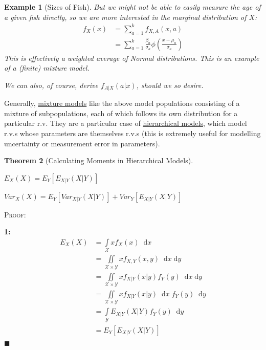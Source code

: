 \documentclass[12pt,a4paper]{article}
\newcommand{\diff}{\;\mathrm{d}}
\newtheorem{thm}{Theorem}[subsection]
\newtheorem{ex}[thm]{Example}
\begin{document}
\begin{ex}[Sizes of Fish]
But we might not be able to easily measure the age of a given fish directly, so we are more interested in the marginal distribution of $X$:
\begin{align*}
f_X(x) &= \sum_{a=1}^k f_{X,A}(x,a)\\
&= \sum_{a=1}^k \frac{\beta_a}{\sigma_a} \phi\left(\frac{x-\mu_a}{\sigma_a}\right)
\end{align*}
This is effectively a weighted average of Normal distributions. This is an example of a (finite) mixture model.

We can also, of course, derive $f_{A|X}(a|x)$, should we so desire.

\end{ex}

Generally, \underline{mixture models} like the above model populations consisting of a mixture of subpopulations, each of which follows its own distribution for a particular r.v. They are a particular case of \underline{hierarchical models}, which model r.v.s whose parameters are themselves r.v.s (this is extremely useful for modelling uncertainty or measurement error in parameters).

\begin{thm}[Calculating Moments in Hierarchical Models]\label{iterated expectation}\vspace{1cm}

 $E_{X}(X) = E_{Y}[E_{{X|Y}}(X|Y)]$

 $Var_{X}(X) = E_{Y}[Var_{{X|Y}}(X|Y)] + Var_{Y}[E_{{X|Y}}(X|Y)]$

\end{thm}

\noindent\textsc{Proof:}\par\vspace{1cm}

{\bf1: }
\begin{align*}
E_{X}(X) &= \int\limits_{\mathcal{X}}\!\! xf_X(x)\;\diff x\\
&= \iint\limits_{\mathcal{X}\times\mathcal{Y}}\!\! xf_{X,Y}(x,y)\;\diff x \diff y\\
&= \iint\limits_{\mathcal{X}\times\mathcal{Y}}\!\! xf_{X|Y}(x|y) f_Y(y)\; \diff x \diff y\\
&= \iint\limits_{\mathcal{X}\times\mathcal{Y}}\!\! xf_{X|Y}(x|y)\;\diff x\; f_Y(y)\; \diff y\\
&= \int\limits_{\mathcal{Y}}\!\! E_{{X|Y}}(X|Y) f_Y(y)\; \diff y\\
&= E_{Y}[E_{X|Y}(X|Y)]
\end{align*} \hfill$\blacksquare$
\end{document}

